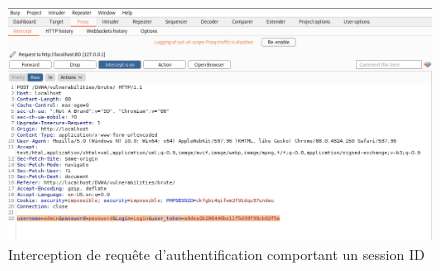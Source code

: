 \documentclass[12pt, oneside]{article}
\begin{document}
\begin{figure}[H]
\centering
\includegraphics[scale=0.4]{2}
\caption{Interception de requête d'authentification comportant un session ID}
\end{figure}
\end{document}
